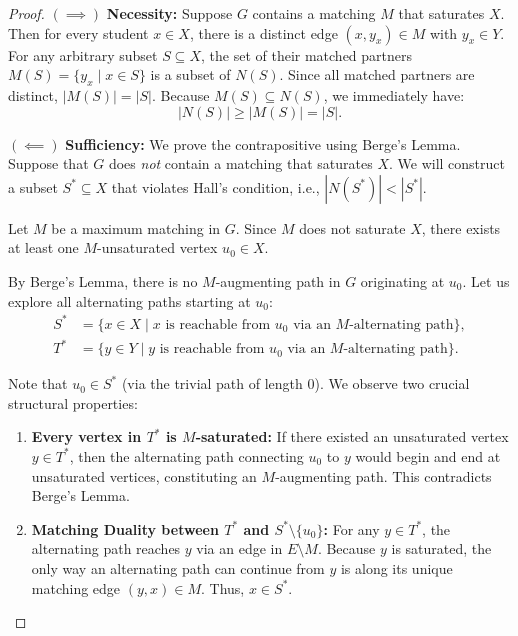 \documentclass[11pt,a4paper]{article}
\begin{document}
\begin{proof}
$(\implies)$ \textbf{Necessity:} Suppose $G$ contains a matching $M$ that saturates $X$. Then for every student $x \in X$, there is a distinct edge $(x, y_x) \in M$ with $y_x \in Y$. For any arbitrary subset $S \subseteq X$, the set of their matched partners $M(S) = \{y_x \mid x \in S\}$ is a subset of $N(S)$. Since all matched partners are distinct, $|M(S)| = |S|$. Because $M(S) \subseteq N(S)$, we immediately have:
\[
  |N(S)| \ge |M(S)| = |S|.
\]

$(\impliedby)$ \textbf{Sufficiency:} We prove the contrapositive using Berge's Lemma. Suppose that $G$ does \emph{not} contain a matching that saturates $X$. We will construct a subset $S^* \subseteq X$ that violates Hall's condition, i.e., $|N(S^*)| < |S^*|$.

Let $M$ be a maximum matching in $G$. Since $M$ does not saturate $X$, there exists at least one $M$-unsaturated vertex $u_0 \in X$. 

By Berge's Lemma, there is no $M$-augmenting path in $G$ originating at $u_0$. Let us explore all alternating paths starting at $u_0$:
\begin{align*}
  S^* &= \{x \in X \mid x \text{ is reachable from } u_0 \text{ via an } M\text{-alternating path}\}, \\
  T^* &= \{y \in Y \mid y \text{ is reachable from } u_0 \text{ via an } M\text{-alternating path}\}.
\end{align*}

Note that $u_0 \in S^*$ (via the trivial path of length 0). We observe two crucial structural properties:
\begin{enumerate}
  \item \textbf{Every vertex in $T^*$ is $M$-saturated:} If there existed an unsaturated vertex $y \in T^*$, then the alternating path connecting $u_0$ to $y$ would begin and end at unsaturated vertices, constituting an $M$-augmenting path. This contradicts Berge's Lemma.
  \item \textbf{Matching Duality between $T^*$ and $S^* \setminus \{u_0\}$:} For any $y \in T^*$, the alternating path reaches $y$ via an edge in $E \setminus M$. Because $y$ is saturated, the only way an alternating path can continue from $y$ is along its unique matching edge $(y, x) \in M$. Thus, $x \in S^*$. 
  

\end{enumerate}
\end{proof}
\end{document}

